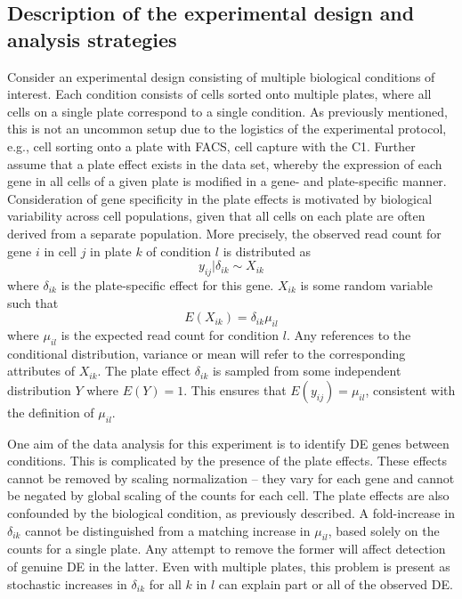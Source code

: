 \documentclass{article}
\begin{document}
\subsection{Description of the experimental design and analysis strategies}
Consider an experimental design consisting of multiple biological conditions of interest.
Each condition consists of cells sorted onto multiple plates, where all cells on a single plate correspond to a single condition.
As previously mentioned, this is not an uncommon setup due to the logistics of the experimental protocol, e.g., cell sorting onto a plate with FACS, cell capture with the C1.
Further assume that a plate effect exists in the data set, whereby the expression of each gene in all cells of a given plate is modified in a gene- and plate-specific manner.
Consideration of gene specificity in the plate effects is motivated by biological variability across cell populations, 
    given that all cells on each plate are often derived from a separate population.
More precisely, the observed read count for gene $i$ in cell $j$ in plate $k$ of condition $l$ is distributed as 
\[
    y_{ij} | \delta_{ik}  \sim X_{ik}
\]
where $\delta_{ik}$ is the plate-specific effect for this gene.
$X_{ik}$ is some random variable such that 
\[
    E(X_{ik}) = \delta_{ik}\mu_{il}
\]
where $\mu_{il}$ is the expected read count for condition $l$. 
Any references to the conditional distribution, variance or mean will refer to the corresponding attributes of $X_{ik}$.
The plate effect $\delta_{ik}$ is sampled from some independent distribution $Y$ where $E(Y) = 1$.
This ensures that $E(y_{ij}) = \mu_{il}$, consistent with the definition of $\mu_{il}$.

One aim of the data analysis for this experiment is to identify DE genes between conditions.
This is complicated by the presence of the plate effects.
These effects cannot be removed by scaling normalization 
    -- they vary for each gene and cannot be negated by global scaling of the counts for each cell.
The plate effects are also confounded by the biological condition, as previously described.
A fold-increase in $\delta_{ik}$ cannot be distinguished from a matching increase in $\mu_{il}$, based solely on the counts for a single plate.
Any attempt to remove the former will affect detection of genuine DE in the latter.
Even with multiple plates, this problem is present as stochastic increases in $\delta_{ik}$ for all $k$ in $l$ can explain part or all of the observed DE.
\end{document}

